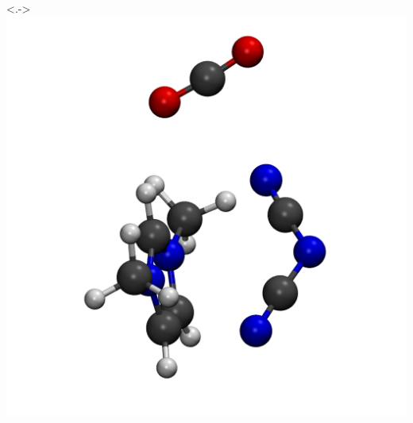 \documentclass{beamer}
\begin{document}
\begin{frame}
  \begin{columns}
    \uncover<.->{\includegraphics[scale=0.08]{./figures/cluster_DCA.png}}

\end{columns}
\end{frame}
\end{document}
